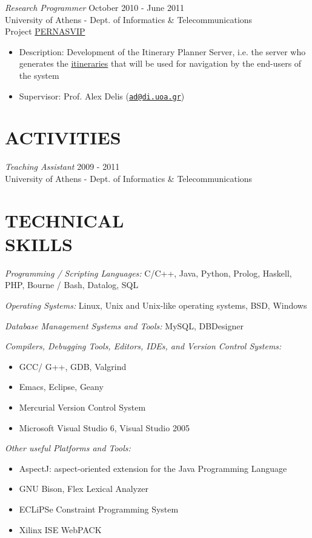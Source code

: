 \documentclass[margin]{res}
\begin{document}
\begin{resume}
        {\sl Research Programmer} \hfill October 2010 - June 2011 \\
        University of Athens - Dept. of Informatics \& Telecommunications \\
        Project \href{http://pernasvip.di.uoa.gr/index.php}{PERNASVIP}
        \begin{itemize}
        \item Description: Development of the Itinerary Planner Server, i.e. the server who
          generates the 
          \href{http://pernasvip.di.uoa.gr/index.php/gen-spef/itinerary-example}{itineraries} 
          that will be used for navigation by the end-users of the system
        \item Supervisor: Prof. Alex Delis
          (\href{mailto:ad@di.uoa.gr}{\nolinkurl{ad@di.uoa.gr}})
        \end{itemize}
            
\section{ACTIVITIES}
        {\sl Teaching Assistant} \hfill 2009 - 2011 \\
        University of Athens - Dept. of Informatics \& Telecommunications

\section{TECHNICAL \\ SKILLS}
        {\sl Programming / Scripting Languages:} 
        C/C++, Java, Python, Prolog, Haskell, PHP, Bourne / Bash, Datalog, SQL

        {\sl Operating Systems:}
        Linux, Unix and Unix-like operating systems, BSD, Windows

        {\sl Database Management Systems and Tools:}
        MySQL, DBDesigner

        {\sl Compilers, Debugging Tools, Editors, IDEs, and Version Control Systems:}
        \begin{itemize}
        \item GCC/ G++, GDB, Valgrind
        \item Emacs, Eclipse, Geany
        \item Mercurial Version Control System
        \item Microsoft Visual Studio 6, Visual Studio 2005
        \end{itemize}

        {\sl Other useful Platforms and Tools:}
        \begin{itemize}
        \item AspectJ: aspect-oriented extension for the Java Programming Language
        \item GNU Bison, Flex Lexical Analyzer
        \item ECLiPSe Constraint Programming System
        \item Xilinx ISE WebPACK
        \end{itemize}


\end{resume}
\end{document}
